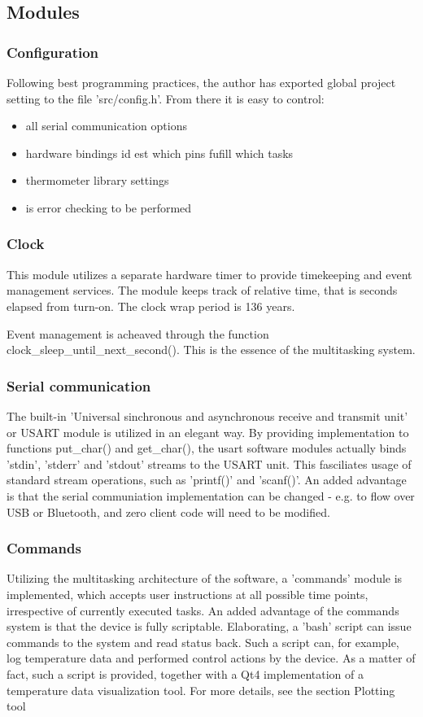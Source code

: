 \subsection{Modules}
\subsubsection{Configuration}
Following best programming practices, the author has exported global project setting to the file 'src/config.h'.
From there it is easy to control:
\begin{itemize}
\item{all serial communication options}
\item{hardware bindings id est which pins fufill which tasks}
\item{thermometer library settings}
\item{is error checking to be performed}
\end{itemize}

\subsubsection{Clock}
This module utilizes a separate hardware timer to provide timekeeping and event management services.
The module keeps track of relative time, that is seconds elapsed from turn-on.
The clock wrap period is 136 years.
\par
Event management is acheaved through the function clock\_sleep\_until\_next\_second().
This is the essence of the multitasking system.

\subsubsection{Serial communication}
The built-in 'Universal sinchronous and asynchronous receive and transmit unit' or USART module is utilized in an elegant way.
By providing implementation to functions put\_char() and get\_char(), the usart software modules actually binds 'stdin', 'stderr' and 'stdout' streams to the USART unit.
This fasciliates usage of standard stream operations, such as 'printf()' and 'scanf()'.
An added advantage is that the serial communiation implementation can be changed - e.g. to flow over USB or Bluetooth, and zero client code will need to be modified.

\subsubsection{Commands}
Utilizing the multitasking architecture of the software, a 'commands' module is implemented, which accepts user instructions at all possible time points, irrespective of currently executed tasks.
An added advantage of the commands system is that the device is fully scriptable.
Elaborating, a 'bash' script can issue commands to the system and read status back.
Such a script can, for example, log temperature data and performed control actions by the device.
As a matter of fact, such a script is provided, together with a Qt4 implementation of a temperature data visualization tool.
For more details, see the section Plotting tool

